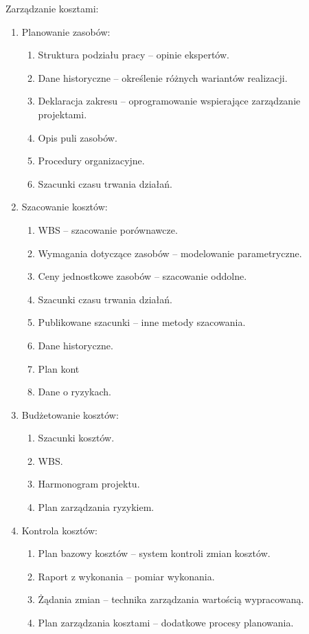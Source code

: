 Zarządzanie kosztami:
\begin{enumerate}
\item Planowanie zasobów:
\begin{enumerate}
\item Struktura podziału pracy – opinie ekspertów.
\item Dane historyczne – określenie różnych wariantów realizacji.
\item Deklaracja zakresu – oprogramowanie wspierające zarządzanie projektami.
\item Opis puli zasobów.
\item Procedury organizacyjne.
\item Szacunki czasu trwania działań.
\end{enumerate}

\item Szacowanie kosztów:
\begin{enumerate}

\item WBS – szacowanie porównawcze.
\item Wymagania dotyczące zasobów – modelowanie parametryczne.
\item Ceny jednostkowe zasobów – szacowanie oddolne.
\item Szacunki czasu trwania działań.
\item Publikowane szacunki – inne metody szacowania.
\item Dane historyczne.
\item Plan kont
\item Dane o ryzykach.

\end{enumerate}

\item Budżetowanie kosztów:

\begin{enumerate}

\item Szacunki kosztów.
\item WBS.
\item Harmonogram projektu.
\item Plan zarządzania ryzykiem.

\end{enumerate}

\item Kontrola kosztów:
\begin{enumerate}
\item Plan bazowy kosztów – system kontroli zmian kosztów.
\item Raport z wykonania – pomiar wykonania.
\item Żądania zmian – technika zarządzania wartością wypracowaną.
\item Plan zarządzania kosztami – dodatkowe procesy planowania.
\end{enumerate}
\end{enumerate}

